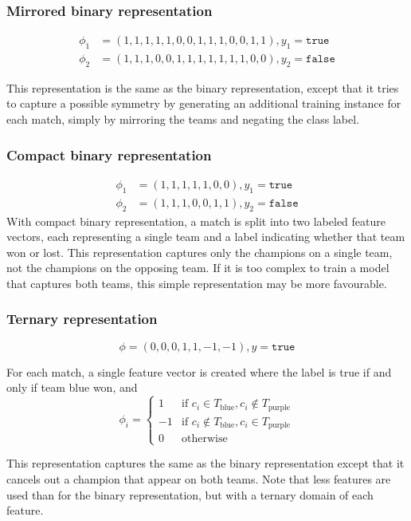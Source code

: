 \subsubsection{Mirrored binary representation}

\begin{align*}
  \phi_1 &= (1,1,1,1,1,0,0,1,1,1,0,0,1,1), y_1 = \texttt{true}\\
  \phi_2 &= (1,1,1,0,0,1,1,1,1,1,1,1,0,0), y_2 = \texttt{false}
\end{align*}

This representation is the same as the binary representation, except that it tries to capture a possible symmetry by generating an additional training instance for each match, simply by mirroring the teams and negating the class label.

\subsubsection{Compact binary representation}
\begin{align*}
  \phi_1 &= (1,1,1,1,1,0,0), y_1 = \mathtt{true} \\
  \phi_2 &= (1,1,1,0,0,1,1), y_2 =\mathtt{false}
\end{align*}
With compact binary representation, a match is split into two labeled feature vectors, each representing a single team and a label indicating whether that team won or lost.
This representation captures only the champions on a single team, not the champions on the opposing team.
If it is too complex to train a model that captures both teams, this simple representation may be more favourable.

\subsubsection{Ternary representation}

\[\phi = (0,0,0,1,1,-1,-1), y = \mathtt{true}\]

For each match, a single feature vector is created where the label is true if and only if team blue won, and
\[
    \phi_i = 
\begin{cases}
  1  & \text{if } c_i \in T_\text{blue}, c_i \not\in T_\text{purple}\\
  -1 & \text{if } c_i \not\in T_\text{blue}, c_i \in T_\text{purple}\\
  0  & \text{otherwise}
\end{cases}
\]

This representation captures the same as the binary representation except that it cancels out a champion that appear on both teams.
Note that less features are used than for the binary representation, but with a ternary domain of each feature.


